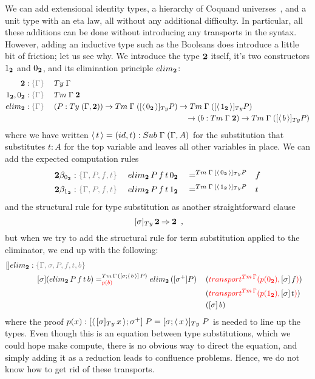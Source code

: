 \documentclass[a4paper,UKenglish,numberwithinsect,cleveref,thm-restate]{lipics-v2021}
\begin{document}
We can add extensional identity types, a hierarchy of Coquand universes~\cite{Coquand2018}, and a unit type with an eta law, all without any additional difficulty. In particular, all these additions can be done without introducing any transports in the syntax. However, adding an inductive type such as the Booleans does introduce a little bit of friction; let us see why. We introduce the type $\mathbf{2}$ itself, it's two constructors ${1_{\mathbf{2}}}$ and ${0_{\mathbf{2}}}$, and its elimination principle $\belim$:
%
\begin{alignat*}{3}
  \bool     &: \implicit{\Gamma}         \;  && \Ty\;\Gamma \\
  \btrue, \bfalse &: \implicit{\Gamma}   \;  && \Tm\;\Gamma\;\bool \\
  \belim &: \implicit{\Gamma} \; && (P : \Ty\;(\Gamma , \bool)) \to \Tm\;\Gamma\;([ \instSub{\bfalse} ]_{\Ty} P) \to \Tm\;\Gamma\;([ \instSub{\btrue} ]_{\Ty} P) \\
  &&& \qquad\qquad\qquad\qquad\qquad\qquad\qquad\qquad\quad \to (b : \Tm\;\Gamma\;\bool) \to \Tm\;\Gamma\;([ \instSub{b} ]_{\Ty} P)
\end{alignat*}
%
where we have written $\instSub{t} = (\idS, t) : \Sub\;\Gamma\;(\Gamma, A)$ for the substitution that substitutes $t : A$ for the top variable and leaves all other variables in place. We can add the expected computation rules
%
\begin{alignat*}{5}
  \bool\beta_{\bfalse}           & : \implicit{\Gamma, P, f, t}\; && \belim\,P\,f\,t\,\bfalse && =^{\Tm\;\Gamma\;[\instSub{\bfalse}]_{\Ty} P} && f \\
  \bool\beta_{\btrue}           & : \implicit{\Gamma, P, f, t}\; && \belim\,P\,f\,t\,\btrue && =^{\Tm\;\Gamma\;[\instSub{\btrue}]_{\Ty} P} && t
\end{alignat*}
%
and the structural rule for type substitution as another straightforward clause
\[
  \;[ \sigma ]_{\Ty}\,\bool \reduce \bool \enspace ,
\]
but when we try to add the structural rule for term substitution applied to the eliminator, we end up with the following:
%
\begin{alignat*}{5}
  []\belim & : \implicit{\Gamma, \sigma, P, f, t, b}\; \\ & \quad [ \sigma ] (\belim\,P\,f\,t\,b) =^{\Tm\,\Gamma\,([ \sigma; \instSub{b} ]\,P)}_{\alert{p(b)}} \belim\,([ \sigma^+ ] P)\,&&(\alert{\transfib{\Tm\,\Gamma}{p(\bfalse)}{\textcolor{black}{[ \sigma ]\,f}}}) \\&&&(\alert{\transfib{\Tm\,\Gamma}{p(\btrue)}{\textcolor{black}{[ \sigma ]\,t}}})\\&&&([\sigma ]\,b)
\end{alignat*}
where the proof $p(x) : [ \instSub{[ \sigma ]_{\Ty}\,x} ; \sigma^+ ]\;P = [ \sigma ; \instSub{x} ]_{\Ty}\;P$ is needed to line up the types. Even though this is an equation between type substitutions, which we could hope make compute, there is no obvious way to direct the equation, and simply adding it as a reduction leads to confluence problems. Hence, we do not know how to get rid of these transports.
\end{document}
